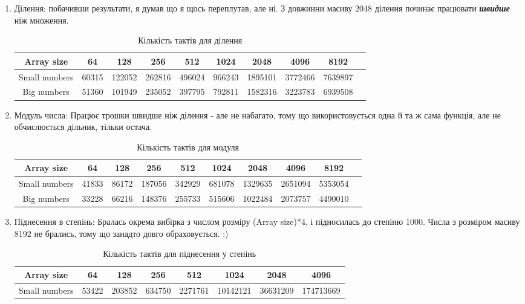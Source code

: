 \documentclass{article}
\begin{document}
\begin{enumerate}
\item Ділення: побачивши результати, я думав що я щось переплутав, але ні. З довжинни масиву 2048 ділення починає працювати \textbf{\textit{швидше}} ніж множення.
\begin{table}[ht!]
\centering
\begin{tabular}{|c|c|c|c|c|c|c|c|c|c|}
\hline
Array size& 64 & 128 & 256 & 512 & 1024 & 2048 & 4096 & 8192 \\\hline
Small numbers & 60315 & 122052 & 262816 & 496024 & 966243 & 1895101 & 3772466 & 7639897  \\ 
Big numbers & 51360 & 101949 & 235052 & 397795 & 792811 & 1582316 & 3223783 & 6939508  \\ \hline
\end{tabular}
\caption{\label{tab:div}Кількість тактів для ділення}
\end{table}
\item Модуль числа: Працює трошки швидше ніж ділення - але не набагато, тому що використовується одна й та ж сама функція, але не обчислюється дільник, тільки остача.

\begin{table}[ht!]
\centering
\begin{tabular}{|c|c|c|c|c|c|c|c|c|c|}
\hline
Array size& 64 & 128 & 256 & 512 & 1024 & 2048 & 4096 & 8192 \\\hline
Small numbers & 41833 & 86172 & 187056 & 342929 & 681078 & 1329635 & 2651094 & 5353054  \\ 
Big numbers & 33228 & 66216 & 148376 & 255733 & 515606 & 1022484 & 2073757 & 4490010  \\ \hline
\end{tabular}
\caption{\label{tab:mod}Кількість тактів для модуля}
\end{table}


\item Піднесення в степінь: Бралась окрема вибірка з числом розміру (Array size)$*4$, і підносилась до степіню 1000. Числа з розміром масиву 8192 не брались, тому що занадто довго обраховується. :)

\begin{table}[ht!]
\centering
\begin{tabular}{|c|c|c|c|c|c|c|c|}
\hline
Array size& 64 & 128 & 256 & 512 & 1024 & 2048 & 4096  \\\hline
Small numbers & 53422 & 203852 & 634750 & 2271761 & 10142121 & 36631209 & 174713669  \\ \hline
\end{tabular}
\caption{\label{tab:pow}Кількість тактів для піднесення у степінь}



\end{table}

\end{enumerate}
\end{document}
